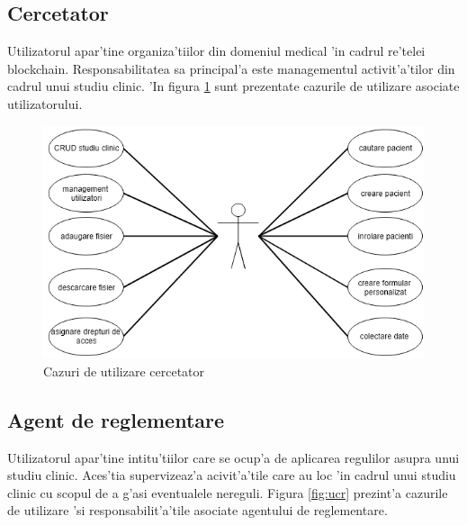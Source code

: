 \documentclass[12pt,a4paper,twoside]{report}
\begin{document}
\subsection{Cercetator} Utilizatorul apar'tine organiza'tiilor din domeniul medical 'in cadrul re'telei blockchain. Responsabilitatea sa principal'a este managementul activit'a'tilor din cadrul unui studiu clinic. 'In figura \ref{fig:ucc} sunt prezentate cazurile de utilizare asociate utilizatorului.

	\begin{figure}[H]
		\begin{center}
			\includegraphics[scale=0.65]{img/uc_cerc.PNG}
			\caption{Cazuri de utilizare cercetator}
  			\label{fig:ucc}
  		\end{center}
  	\end{figure}
  		
 
 

\subsection{Agent de reglementare} Utilizatorul apar'tine intitu'tiilor care se ocup'a de aplicarea regulilor asupra unui studiu clinic. Aces'tia supervizeaz'a acivit'a'tile care au loc 'in cadrul unui studiu clinic cu scopul de a g'asi eventualele nereguli. Figura \ref{fig:ucr} prezint'a cazurile de utilizare 'si responsabilit'a'tile asociate agentului de reglementare.
\end{document}
